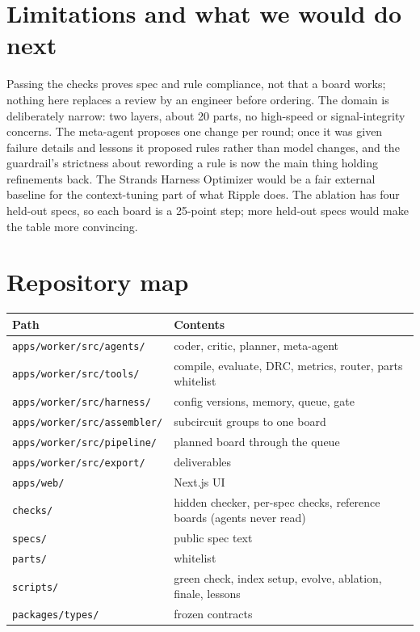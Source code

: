 \documentclass[11pt,a4paper]{article}
\newcommand{\code}[1]{\texttt{#1}}
\begin{document}
\section{Limitations and what we would do next}

Passing the checks proves spec and rule compliance, not that a board works; nothing here replaces a review by an engineer before ordering. The domain is deliberately narrow: two layers, about 20 parts, no high-speed or signal-integrity concerns. The meta-agent proposes one change per round; once it was given failure details and lessons it proposed rules rather than model changes, and the guardrail's strictness about rewording a rule is now the main thing holding refinements back. The Strands Harness Optimizer would be a fair external baseline for the context-tuning part of what Ripple does. The ablation has four held-out specs, so each board is a 25-point step; more held-out specs would make the table more convincing.

\appendix

\section{Repository map}

\begin{center}
\begin{tabular}{@{}L{5cm}L{10cm}@{}}
\toprule
Path & Contents \\
\midrule
\code{apps/worker/src/agents/} & coder, critic, planner, meta-agent \\
\code{apps/worker/src/tools/} & compile, evaluate, DRC, metrics, router, parts whitelist \\
\code{apps/worker/src/harness/} & config versions, memory, queue, gate \\
\code{apps/worker/src/assembler/} & subcircuit groups to one board \\
\code{apps/worker/src/pipeline/} & planned board through the queue \\
\code{apps/worker/src/export/} & deliverables \\
\code{apps/web/} & Next.js UI \\
\code{checks/} & hidden checker, per-spec checks, reference boards (agents never read) \\
\code{specs/} & public spec text \\
\code{parts/} & whitelist \\
\code{scripts/} & green check, index setup, evolve, ablation, finale, lessons \\
\code{packages/types/} & frozen contracts \\
\bottomrule
\end{tabular}
\end{center}
\end{document}
